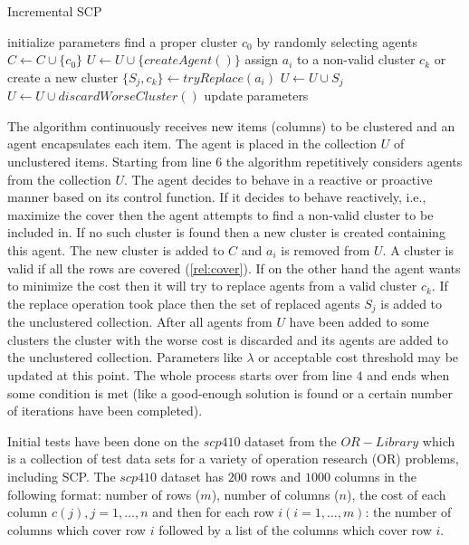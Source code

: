 \begin{algorithm}
\caption{Incremental SCP}
\label{alg:incremental_SCP}
\begin{algorithmic}[1]
\STATE initialize parameters
\STATE find a proper cluster $c_{0}$ by randomly selecting agents
\STATE $C \leftarrow C \cup \{c_{0}\}$
\STATE $U \leftarrow U \cup \{createAgent()\}$ 
\STATE assign $a_{i}$ to a non-valid cluster $c_{k}$ or create a new cluster 
\ELSE
\STATE $\{S_{j}, c_{k}\} \leftarrow tryReplace(a_{i})$
\STATE $U \leftarrow U \cup S_{j}$
\ENDIF
\ENDWHILE
\STATE $U \leftarrow U \cup discardWorseCluster()$
\STATE update parameters
\ENDWHILE
\end{algorithmic}
\end{algorithm}


The algorithm continuously receives new items (columns) to be clustered and an agent encapsulates each item. The agent is placed in the collection $U$ of unclustered items. Starting from line $6$ the algorithm repetitively considers agents from the collection $U$. The agent decides to behave in a reactive or proactive manner based on its control function. If it decides to behave reactively, i.e., maximize the cover then the agent attempts to find a non-valid cluster to be included in. If no such cluster is found then a new cluster is created containing this agent. The new cluster is added to $C$ and $a_{i}$ is removed from $U$. A cluster is valid if all the rows are covered (\ref{rel:cover}). If on the other hand the agent wants to minimize the cost then   
it will try to replace agents from a valid cluster $c_{k}$. If the replace operation took place then the set of replaced agents $S_{j}$ is added to the unclustered collection. After all agents from $U$ have been added to some clusters the cluster with the worse cost is discarded and its agents are added to the unclustered collection. Parameters like $\lambda$ or acceptable cost threshold may be updated at this point. The whole process starts over from line $4$ and ends when some condition is met (like a good-enough solution is found or a certain number of iterations have been completed). 


Initial tests have been done on the $scp410$ dataset from the $OR-Library$ \cite{website:scp} which is a collection of test data sets for a variety of operation research (OR) problems, including SCP. The $scp410$ dataset has $200$ rows and $1000$ columns in the following format: number of rows ($m$), number of columns ($n$), the cost of each column $c(j),j=1,\dots,n$ and then for each row $i (i=1,\dots,m)$: the number of columns which cover row $i$ followed by a list of the columns which cover row $i$.

